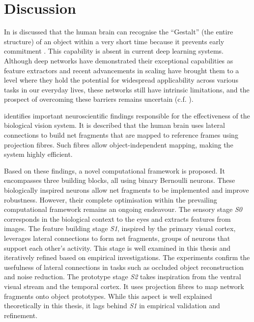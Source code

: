 \section{Discussion}
In  is discussed that the human brain can recognise the ``Gestalt'' (the entire structure) of an object within a very short time \cite{ellis_source_1938, kohler_gestalt_1992, wagemans_century_2012, hamlyn_psychology_2017} because it prevents early commitment \cite{marr_vision_2010}.
This capability is absent in current deep learning systems.
Although deep networks have demonstrated their exceptional capabilities as feature extractors and recent advancements in scaling have brought them to a level where they hold the potential for widespread applicability across various tasks in our everyday lives, these networks still have intrinsic limitations, and the prospect of overcoming these barriers remains uncertain (c.f. ).

 identifies important neuroscientific findings responsible for the effectiveness of the biological vision system.
It is described that the human brain uses lateral connections to build net fragments that are mapped to reference frames using projection fibres.
Such fibres allow object-independent mapping, making the system highly efficient.

Based on these findings, a novel computational framework is proposed.
It encompasses three building blocks, all using binary Bernoulli neurons.
These biologically inspired neurons allow net fragments to be implemented and improve robustness. However, their complete optimisation within the prevailing computational framework remains an ongoing endeavour.
The sensory stage \emph{S0} corresponds in the biological context to the eyes and extracts features from images.
The feature building stage \emph{S1}, inspired by the primary visual cortex, leverages lateral connections to form net fragments, groups of neurons that support each other's activity.
This stage is well examined in this thesis and iteratively refined based on empirical investigations.
The experiments confirm the usefulness of lateral connections in tasks such as occluded object reconstruction and noise reduction.
The prototype stage \emph{S2} takes inspiration from the ventral visual stream and the temporal cortex.
It uses projection fibres to map network fragments onto object prototypes. While this aspect is well explained theoretically in this thesis, it lags behind \emph{S1} in empirical validation and refinement.

